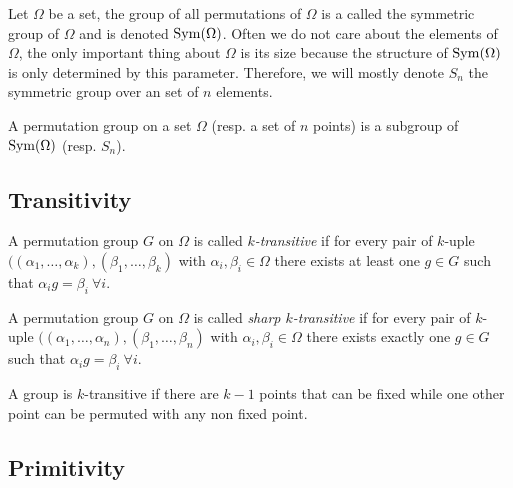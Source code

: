 \begin{definition}
  Let $\Omega$ be a set, the group of all permutations of $\Omega$ is a called the symmetric group of $\Omega$ and is denoted $\operatorname{Sym}(\Omega)$. Often we do not care about the elements of $\Omega$, the only important thing about $\Omega$ is its size because the structure of $\operatorname{Sym}(\Omega)$ is only determined by this parameter. Therefore, we will mostly denote $S_n$ the symmetric group over an set of $n$ elements.
\end{definition}

\begin{definition}
  A permutation group on a set $\Omega$ (resp. a set of $n$ points) is a subgroup of $\operatorname{Sym}(\Omega)$ (resp. $S_n$).
\end{definition}

\subsection{Transitivity}

\begin{definition}
  A permutation group $G$ on $\Omega$ is called \textit{$k$-transitive} if for every pair of $k$-uple $((\alpha_1, \dots, \alpha_k), (\beta_1, \dots, \beta_k)$ with $\alpha_i, \beta_i \in \Omega$ there exists at least one $g \in G$ such that $\alpha_i g = \beta_i \  \forall i$.
\end{definition}

\begin{definition}
  A permutation group $G$ on $\Omega$ is called \textit{sharp $k$-transitive} if for every pair of $k$-uple $((\alpha_1, \dots, \alpha_n), (\beta_1, \dots, \beta_n)$ with $\alpha_i, \beta_i \in \Omega$ there exists exactly one $g \in G$ such that $\alpha_i g = \beta_i \  \forall i$.
\end{definition}

\begin{property}
  \label{practical-transitivity}
  A group is $k$-transitive if there are $k-1$ points that can be fixed while one other point can be permuted with any non fixed point.
\end{property}

\subsection{Primitivity}

